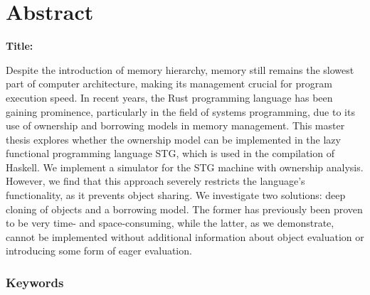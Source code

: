 \chapter*{Abstract}

\noindent\textbf{Title:} \ttitleEn
\bigskip


Despite the introduction of memory hierarchy, memory still remains the slowest part of computer architecture, making its management crucial for program execution speed. In recent years, the Rust programming language has been gaining prominence, particularly in the field of systems programming, due to its use of ownership and borrowing models in memory management. This master thesis explores whether the ownership model can be implemented in the lazy functional programming language STG, which is used in the compilation of Haskell. We implement a simulator for the STG machine with ownership analysis. However, we find that this approach severely restricts the language’s functionality, as it prevents object sharing. We investigate two solutions: deep cloning of objects and a borrowing model. The former has previously been proven to be very time- and space-consuming, while the latter, as we demonstrate, cannot be implemented without additional information about object evaluation or introducing some form of eager evaluation.


\subsection*{Keywords}
\textit{\tkeywordsEn}
\clearemptydoublepage